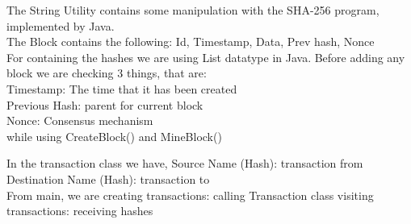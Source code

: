 \documentclass[a4paper,12pt]{report}
\begin{document}
The String Utility contains some manipulation with the SHA-256 program, implemented by Java.\\

The Block contains the following:
Id, 
Timestamp, 
Data, 
Prev hash, 
Nonce\\

For containing the hashes we are using List datatype in Java. Before adding any block we are checking 3 things, that are:\\
Timestamp: The time that it has been created\\
Previous Hash: parent for current block\\
Nonce: Consensus mechanism\\

while using CreateBlock() and MineBlock()

In the transaction class we have,
	Source Name (Hash): transaction from\\
	Destination Name (Hash): transaction to\\

From main, we are
	creating transactions: calling Transaction class
	visiting transactions: receiving hashes
\end{document}
